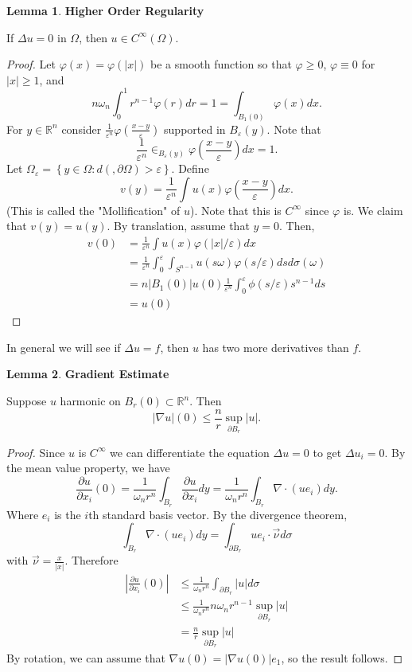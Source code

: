 \documentclass[12pt, a4paper]{article}
\theoremstyle{definition}
\newtheorem{lemma}{Lemma}
\newcommand{\R}{\mathbb{R}}                           %
\newcommand{\bd}{\partial}
\newcommand{\grad}{\nabla}
\newcommand{\ep}{\varepsilon}
\begin{document}
\begin{tcolorbox}
\begin{lemma}
	\textbf{Higher Order Regularity}
\end{lemma}
	If $\Delta u =0$ in $\Omega$, then $u \in C^\infty (\Omega)$. 
\begin{proof}
	Let $\varphi(x) = \varphi(|x|)$ be a smooth function so that $\varphi \geq 0$, $\varphi \equiv 0$ for $|x|\geq 1$, and 
	$$ n \omega_n \int_0^1 r^{n-1} \varphi(r) dr = 1 = \int_{B_1(0)} \varphi(x) dx. $$ 
	For $y\in \R^n$ consider $ \frac{ 1 }{ \ep^n } \varphi \left( \frac{ x-y }{ \ep } \right)$ supported in $B_\ep (y)$. Note that 
	$$ \frac{ 1 }{ \ep^n  }\in_{B_\ep (y)} \varphi \left( \frac{ x-y }{ \ep } \right)dx = 1. $$ 
	Let $\Omega_\ep = \left\{ y\in \Omega : d(, \bd \Omega) > \ep \right\}$. 
	Define 
	$$ v(y) = \frac{ 1 }{ \ep^n  }\int u(x) \varphi \left( \frac{ x-y }{ \ep }  \right)dx. $$ 
(This is called the "Mollification" of $u$). Note that this is $C^\infty$ since $\varphi$ is. 
	We claim that $v(y) = u(y)$. By translation, assume that $y=0$. 
	Then, 
	\begin{align*}
		v(0) & = \frac{ 1 }{ \ep^n  }\int u(x) \varphi (|x|/\ep) dx
		\\ & = \frac{ 1 }{ \ep^n } \int_0^\ep \int_{S^{n-1}} u(s \omega) \varphi(s/\ep) ds d\sigma(\omega)
		\\ & = n|B_1(0)| u(0) \frac{ 1 }{ \ep^n  }\int_0^\ep \phi (s/\ep)s^{n-1} ds \tag{Mean Value Property}
		\\ & = u(0) \tag{by definition of $\varphi$}
	\end{align*}
\end{proof}
\end{tcolorbox}
In general we will see if $\Delta u = f$, then $u$ has two more derivatives than $f$. 
\begin{tcolorbox}
\begin{lemma}
	\textbf{Gradient Estimate}
\end{lemma}
	Suppose $u$ harmonic on $B_r(0) \subset \R^n$. Then 
	$$ |\grad u|(0) \leq \frac{ n }{ r } \sup_{\bd B_r} |u|. $$ 
	\begin{proof}
	Since $u$ is $C^\infty$ we can differentiate the equation $\Delta u = 0$ to get $\Delta u_i = 0$. By the mean value property, we have
		$$ \frac{ \partial u }{ \partial x_i }(0) = \frac{ 1 }{ \omega_n r^n }\int_{B_r} \frac{ \partial u }{ \partial x_i } dy = \frac{ 1 }{ \omega_n r^n } \int_{B_r} \grad \cdot (u e_i)dy. $$
Where $e_i$ is the $i$th standard basis vector. 
By the divergence theorem, 
		$$ \int_{B_r} \grad \cdot \left( u e_i \right) dy = \int_{\bd B_r} ue_i \cdot \vec{\nu} d\sigma $$ 
with $\vec{\nu} = \frac{ x }{ |x| }$. 
Therefore
\begin{align*}
	\left| \frac{ \partial u }{ \partial x_i  }(0) \right| & \leq \frac{ 1 }{ \omega_n r^n } \int_{\bd B_r} |u| d \sigma 
	\\ & \leq \frac{ 1 }{ \omega_n r^n } n \omega_n r^{n-1} \sup_{\bd B_r} |u|
	\\ & = \frac{ n }{ r }\sup_{\bd B_r} |u|
\end{align*}
		By rotation, we can assume that $\grad u(0) = |\grad u(0)| e_1$, so the result follows. 
	\end{proof}
\end{tcolorbox}
\end{document}
